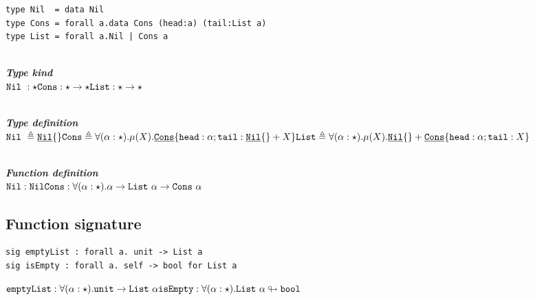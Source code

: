 \documentclass{article}[11pt]
\newcommand{\subsubsubsection}[1]
{
    ~\\
    {\bf {\em #1}} \\
}
\newcommand{\term}[1]{\verb~#1~}
\newcommand{\cons}[1]{\underline{\verb~#1~}}
\begin{document}
    \begin{verbatim}
type Nil  = data Nil
type Cons = forall a.data Cons (head:a) (tail:List a)
type List = forall a.Nil | Cons a
    \end{verbatim}

    \subsubsubsection{Type kind}

    \noindent\begin{math}
                 \term{Nil}~ : \star \\
                 \term{Cons} : \star \rightarrow \star \\
                 \term{List} : \star \rightarrow \star
    \end{math}

    \subsubsubsection{Type definition}

    \noindent\begin{math}
                 \term{Nil}~ \triangleq \cons{Nil}\{\} \\
                 \term{Cons} \triangleq \forall(\alpha:\star).\mu(X).\cons{Cons}\{ \term{head} :\alpha; \term{tail} : \cons{Nil}\{\} + X \} \\
                 \term{List} \triangleq \forall(\alpha:\star).\mu(X).\cons{Nil}\{\} + \cons{Cons}\{ \term{head} :\alpha; \term{tail} : X \}
    \end{math}

    \subsubsubsection{Function definition}

    \noindent\begin{math}
                 \term{Nil} : \term{Nil} \\
                 \term{Cons} : \forall(\alpha:\star).\alpha \rightarrow \term{List}~\alpha \rightarrow \term{Cons} ~ \alpha \\
    \end{math}

    \subsection{Function signature}\label{subsec:function-signature}

    \begin{verbatim}
sig emptyList : forall a. unit -> List a
sig isEmpty : forall a. self -> bool for List a
    \end{verbatim}

    \noindent\begin{math}
                 \term{emptyList} : \forall(\alpha:\star).\term{unit} \rightarrow \term{List}~\alpha \\
                 \term{isEmpty} : \forall(\alpha:\star).\term{List}~\alpha \looparrowright \term{bool}
    \end{math}
\end{document}
